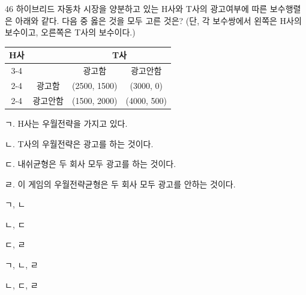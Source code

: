 \begin{question}{46}
하이브리드 자동차 시장을 양분하고 있는 H사와 T사의 광고여부에 따른 보수행렬은 아래와 같다. 다음 중 옳은 것을 모두 고른 것은? (단, 각 보수쌍에서 왼쪽은 H사의 보수이고, 오른쪽은 T사의 보수이다.)
\par
{\small\centering
\begin{tabular}{|c|c|c|c|}\hline
\multirow{4}{*}{H사} & \multirow{2}{*}{~} & \multicolumn{2}{c|}{T사} \\ \cline{3-4}
 & & 광고함 & 광고안함 \\ \cline{2-4}
 & 광고함 & (2500, 1500) & (3000, 0) \\ \cline{2-4}
 & 광고안함 & (1500, 2000) & (4000, 500) \\ \hline
\end{tabular}\par}
\begin{framedtext}
ㄱ. H사는 우월전략을 가지고 있다. \par
ㄴ. T사의 우월전략은 광고를 하는 것이다. \par
ㄷ. 내쉬균형은 두 회사 모두 광고를 하는 것이다. \par
ㄹ. 이 게임의 우월전략균형은 두 회사 모두 광고를 안하는 것이다. \par
\end{framedtext}
\begin{choices}
  \item ㄱ, ㄴ
  \item ㄴ, ㄷ
  \item ㄷ, ㄹ
  \item ㄱ, ㄴ, ㄹ
  \item ㄴ, ㄷ, ㄹ
\end{choices}
\end{question}
